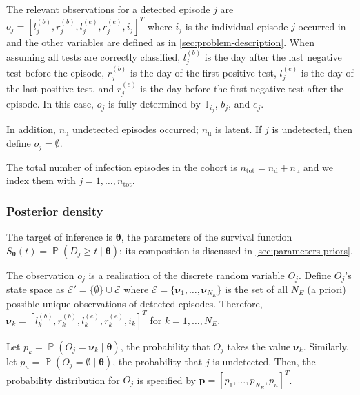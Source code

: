 \documentclass[12pt]{article}
\DeclareMathOperator{\prob}{\mathbb{P}}
\newcommand\set{\mathcal}
\renewcommand{\vec}[1]{\bm{#1}}
\newcommand{\ntot}{n_\text{tot}}
\newcommand{\ndet}{n_\text{d}}
\newcommand{\nnodet}{n_\text{u}}
\newcommand{\sched}{\mathbb{T}}
\begin{document}
The relevant observations for a detected episode $j$ are $o_j = [l_j^{(b)}, r_j^{(b)}, l_j^{(e)}, r_j^{(e)}, i_j]^T$ where $i_j$ is the individual episode $j$ occurred in and the other variables are defined as in \cref{sec:problem-description}.
When assuming all tests are correctly classified, $l_j^{(b)}$ is the day after the last negative test before the episode, $r_j^{(b)}$ is the day of the first positive test, $l_j^{(e)}$ is the day of the last positive test, and $r_j^{(e)}$ is the day before the first negative test after the episode.
In this case, $o_j$ is fully determined by $\sched_{i_j}$, $b_j$, and $e_j$.

In addition, $\nnodet$ undetected episodes occurred; $\nnodet$ is latent.
If $j$ is undetected, then define $o_j = \emptyset$.

The total number of infection episodes in the cohort is $\ntot = \ndet + \nnodet$ and we index them with $j = 1, \dots, \ntot$.

\subsubsection{Posterior density}

The target of inference is $\vec{\theta}$, the parameters of the survival function $S_{\vec{\theta}}(t) = \prob(D_j \geq t \mid \vec\theta)$; its composition is discussed in \cref{sec:parameters-priors}.

The observation $o_j$ is a realisation of the discrete random variable $O_j$.
Define $O_j$'s state space as $\set{E}' = \{ \emptyset \} \cup \set{E}$ where $\set{E} = \{ \vec{\nu}_1, \dots, \vec{\nu}_{N_E} \}$ is the set of all $N_E$ (a priori) possible unique observations of detected episodes.
Therefore, $\vec{\nu}_k = [l^{(b)}_k, r^{(b)}_k, l^{(e)}_k, r^{(e)}_k, i_k]^T$ for $k = 1, \dots, N_E$.

Let $p_k = \prob(O_j = \vec{\nu}_k \mid \vec{\theta})$, the probability that $O_j$ takes the value $\vec{\nu}_k$.
Similarly, let $p_u = \prob(O_j = \emptyset \mid \vec{\theta})$, the probability that $j$ is undetected.
Then, the probability distribution for $O_j$ is specified by $\vec{p} = [p_1, \dots, p_{N_E}, p_u]^T$.
\end{document}
